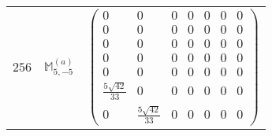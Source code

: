\documentclass[fleqn,8pt,landscape]{jsarticle}
\begin{document}
\begin{center}
\begin{longtable}{ccc}
$ 256 $ & $ \mathbb{M}_{5,-5}^{(a)} $ & $ \begin{pmatrix} 0 & 0 & 0 & 0 & 0 & 0 & 0 \\ 0 & 0 & 0 & 0 & 0 & 0 & 0 \\ 0 & 0 & 0 & 0 & 0 & 0 & 0 \\ 0 & 0 & 0 & 0 & 0 & 0 & 0 \\ 0 & 0 & 0 & 0 & 0 & 0 & 0 \\ \frac{5 \sqrt{42}}{33} & 0 & 0 & 0 & 0 & 0 & 0 \\ 0 & \frac{5 \sqrt{42}}{33} & 0 & 0 & 0 & 0 & 0 \end{pmatrix} $ \\
\end{longtable}
\end{center}
\end{document}
